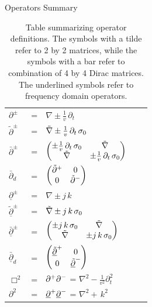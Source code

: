 \documentclass[handout,10pt]{beamer}
\begin{document}
\begin{frame}[shrink=10]{Operators Summary}

\begin{table}[]
\centering
\caption{Table summarizing operator definitions. The symbols with a tilde refer to 2 by 2 matrices, while the symbols with a bar refer to combination of 4 by 4 Dirac matrices. The underlined symbols refer to frequency domain operators.}
\label{operators_definitions}
\begin{tabular}{lllll}
\hline
\hline
\rule{0pt}{3ex} 
$ \partial^\pm$  & = & $\nabla \pm \frac{1}{v}\,\partial_t$ & 
&  
\\
\rule{0pt}{3ex} 
$\tilde{\partial}^\pm$ & =  & $\tilde{\nabla} \pm \frac{1}{v}\,\partial_t \, \sigma_0$  &
  & 
   \\
\rule{0pt}{3ex}
$\bar{\partial}^\pm$ & = & 
$\begin{pmatrix}
 \pm \frac{1}{v}\,\partial_t \, \sigma_0 & \tilde{\nabla} \cr 
\tilde{\nabla} & \pm \frac{1}{v}\,\partial_t \, \sigma_0 \end{pmatrix}$ &
  &  
  \\
\rule{0pt}{3ex} 
  $\bar{\partial}_d$& =  & 
  $ \begin{pmatrix}\tilde{\partial}^+ &0 \cr 0& \tilde{\partial}^-  \end{pmatrix}$ &
    &  \\
 \hline  
 \hline
 \rule{0pt}{3ex}  
% 
${\underline{\partial}}^\pm $ & =  & $ \nabla \pm j\, k\,$  &
  &  \\
\rule{0pt}{3ex} 
${\underline{\tilde{\partial}}}^\pm$  & = & $\tilde{\nabla} \pm j\, k \, \sigma_0 $  &
  &  \\
\rule{0pt}{3ex} 
${\underline{\bar{\partial}}}^\pm$   & =  & $\begin{pmatrix}
 \pm j\, k\, \sigma_0 & \tilde{\nabla} \cr 
\tilde{\nabla} & \pm j\, k\, \sigma_0 \end{pmatrix}$ &
  &  \\
\rule{0pt}{3ex} 
 ${\underline{\bar{\partial}}}_d$   & = &  $\begin{pmatrix}
{\underline{\tilde{\partial}}}^+ & 0\cr 
0 & {\underline{\tilde{\partial}}}^- \end{pmatrix}$
&  
&  \\
\hline
\hline
\rule{0pt}{3ex} 
$\Box^2$      & = & $\partial^+ \partial^-$ =  $\nabla^2 - \frac{1}{v^2}\partial_t^2$ & &   \\
$\partial^2$ & = & ${\underline{\partial}}^+ {\underline{\partial}}^-$ = $\nabla^2 +\, k^2$&  & \\
\hline
\hline
\end{tabular}
\end{table}


\end{frame}
\end{document}
